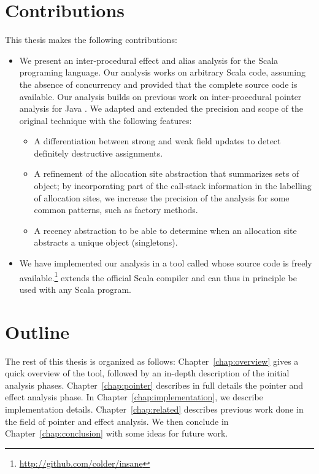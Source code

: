 \section{Contributions}
This thesis makes the following contributions:
\begin{itemize}
    \item
    We present an inter-procedural effect and alias analysis for the Scala
programing language. Our analysis works on arbitrary Scala code, assuming the
absence of concurrency and provided that the complete source code is available.
Our analysis builds on previous work on inter-procedural pointer analysis for
Java \cite{Salcianu2006}. 
We adapted and extended the precision and scope of the original technique with the following features:
    \begin{itemize}
        \item A differentiation between strong and weak field updates to detect
definitely destructive assignments.
        \item A refinement of the allocation
site abstraction that summarizes sets of object;
by incorporating part of the call-stack information in the labelling of
allocation sites, we increase the precision of the analysis for some common
patterns, such as factory methods.
        \item A recency abstraction to be able to determine when an allocation
site abstracts a unique object (singletons).
    \end{itemize}

    \item We have implemented our analysis in a tool called {\insane} whose
source code is freely
available.\footnote{\url{http://github.com/colder/insane}} {\insane} extends
the official Scala compiler and can thus in principle be used with any Scala
program.
\end{itemize}

\section{Outline}
The rest of this thesis is organized as follows: Chapter~\ref{chap:overview}
gives a quick overview of the tool, followed by an in-depth description of the
initial analysis phases. Chapter~\ref{chap:pointer} describes in full details
the pointer and effect analysis phase. In Chapter~\ref{chap:implementation},
we describe implementation details. Chapter~\ref{chap:related} describes
previous work done in the field of pointer and effect analysis. We then
conclude in Chapter~\ref{chap:conclusion} with some ideas for future work.
